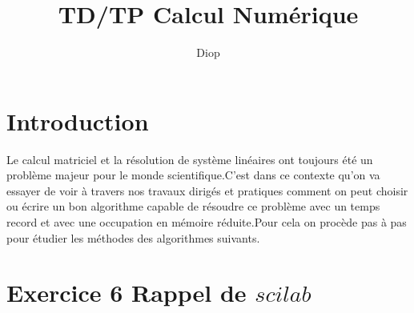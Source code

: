 \documentclass[]{article}
\title{TD/TP Calcul Numérique}
\author{Diop}
\begin{document}
\section{Introduction}
Le calcul matriciel et la résolution de système linéaires ont toujours été un problème majeur pour le monde scientifique.C'est dans ce contexte qu'on va essayer de voir à travers nos travaux dirigés et pratiques comment on peut choisir ou écrire un bon algorithme capable de résoudre ce problème avec un temps record et avec une occupation en mémoire réduite.Pour cela on procède pas à pas pour étudier les méthodes des algorithmes suivants.

\section{Exercice 6 Rappel de $ scilab$}
 
\end{document}
